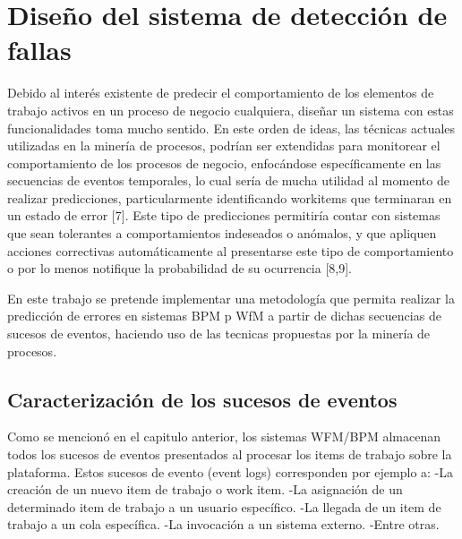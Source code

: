 
\chapter{Diseño del sistema de detección de fallas}

\ifpdf
    \graphicspath{{Chapter2/Figs/Raster/}{Chapter2/Figs/PDF/}{Chapter2/Figs/}}
\else
    \graphicspath{{Chapter2/Figs/Vector/}{Chapter2/Figs/}}
\fi

Debido al interés existente de predecir el comportamiento de los elementos de trabajo activos en un proceso de negocio cualquiera, diseñar un sistema con estas funcionalidades toma mucho sentido. En este orden de ideas, las técnicas actuales utilizadas en la minería de procesos, podrían ser extendidas para monitorear el comportamiento de los procesos de negocio, enfocándose específicamente en las secuencias de eventos temporales, lo cual sería de mucha utilidad al momento de realizar predicciones, particularmente identificando workitems que terminaran en un estado de error [7]. Este tipo de predicciones permitiría contar con sistemas que sean tolerantes a comportamientos indeseados o anómalos, y que apliquen acciones correctivas automáticamente al presentarse este tipo de comportamiento o por lo menos notifique la probabilidad de su ocurrencia [8,9].

En este trabajo se pretende implementar una metodología que permita realizar la predicción de errores en sistemas BPM p WfM a partir de dichas secuencias de sucesos de eventos, haciendo uso de las tecnicas propuestas por la minería de procesos.


\section{Caracterización de los sucesos de eventos} %
\label{section2.1}

Como se mencionó en el capitulo anterior, los sistemas WFM/BPM almacenan todos los sucesos de eventos presentados al procesar los items de trabajo sobre la plataforma. Estos sucesos de evento (event logs)  corresponden por ejemplo a:
-La creación de un nuevo item de trabajo o work item.
-La asignación de un determinado item de trabajo a un usuario específico.
-La llegada de un item de trabajo a un cola específica. 
-La invocación a un sistema externo.
-Entre otras.

